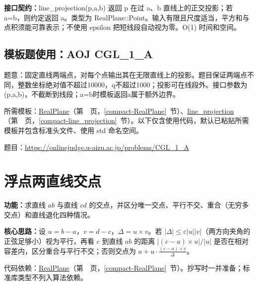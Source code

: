 {\sloppy{}\noindent\textbf{接口契约：}line\_projection(p,a,b) 返回 p 在过 a、b 直线上的正交投影；若 a=b，则约定返回 a。类型为 RealPlane::Point。输入有限且尺度适当，平方和与点积须能可靠表示；不使用 epsilon 把短线段自动视为零。O(1) 时间和空间。\par}



\Needspace{351pt}

\subsection*{模板题使用：AOJ CGL\_1\_A}

\label{usage-example-181}

题意：固定直线两端点，对每个点输出其在无限直线上的投影。题目保证两端点不同，整数坐标绝对值不超过10000，q不超过1000；投影可在线段外。接口参数为(p,a,b)，不截断到线段；a=b时模板返回a属于额外边界。

所需模板：\hyperref[compact-RealPlane]{RealPlane}（第~\pageref{compact-RealPlane}~页，\ref{compact-RealPlane}~节）、\hyperref[compact-line_projection]{line\_\allowbreak{}projection}（第~\pageref{compact-line_projection}~页，\ref{compact-line_projection}~节）。以下仅含使用代码，默认已粘贴所需模板并包含标准头文件、使用 std 命名空间。

题目：\url{https://onlinejudge.u-aizu.ac.jp/problems/CGL_1_A}



\Needspace{541pt}

\section{浮点两直线交点}\label{compact-line_intersection_real}

\noindent\textbf{功能：}\allowbreak 求直线 $ab$ 与直线 $cd$ 的交点，并区分唯一交点、平行不交、重合（无穷多交点）和直线退化四种情况。

\textbf{核心思路：}\allowbreak 设 $u=b-a$，$v=d-c$，$\Delta=u\times v$。若 $|\Delta|\le\varepsilon|u||v|$（两方向夹角的正弦足够小）视为平行，再看 $c$ 到直线 $ab$ 的距离 $|(c-a)\times u|/|u|$ 是否在相对容差内，区分重合与平行不交；否则交点为 $a+u\cdot\frac{(c-a)\times v}{\Delta}$。

代码依赖：\hyperref[compact-RealPlane]{RealPlane}（第~\pageref{compact-RealPlane}~页，\ref{compact-RealPlane}~节）。抄写时一并准备；标准库类型不列入算法依赖。

